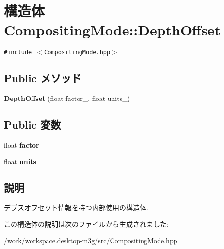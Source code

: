 \hypertarget{structm3g_1_1CompositingMode_1_1DepthOffset}{
\section{構造体 CompositingMode::DepthOffset}
\label{structm3g_1_1CompositingMode_1_1DepthOffset}
}
{\tt \#include $<$CompositingMode.hpp$>$}

\subsection*{Public メソッド}
\begin{CompactItemize}
\item 
\hypertarget{structm3g_1_1CompositingMode_1_1DepthOffset_5bca742cc2bf312b60933a538d3d4107}{
\textbf{DepthOffset} (float factor\_\-, float units\_\-)}
\label{structm3g_1_1CompositingMode_1_1DepthOffset_5bca742cc2bf312b60933a538d3d4107}

\end{CompactItemize}
\subsection*{Public 変数}
\begin{CompactItemize}
\item 
\hypertarget{structm3g_1_1CompositingMode_1_1DepthOffset_323c112c11500270be91b7cb353826bd}{
float \textbf{factor}}
\label{structm3g_1_1CompositingMode_1_1DepthOffset_323c112c11500270be91b7cb353826bd}

\item 
\hypertarget{structm3g_1_1CompositingMode_1_1DepthOffset_1c0298a96a707800b8223cbf532ab42c}{
float \textbf{units}}
\label{structm3g_1_1CompositingMode_1_1DepthOffset_1c0298a96a707800b8223cbf532ab42c}

\end{CompactItemize}


\subsection{説明}
デプスオフセット情報を持つ内部使用の構造体. 

この構造体の説明は次のファイルから生成されました:\begin{CompactItemize}
\item 
/work/workspace.desktop-m3g/src/CompositingMode.hpp\end{CompactItemize}
